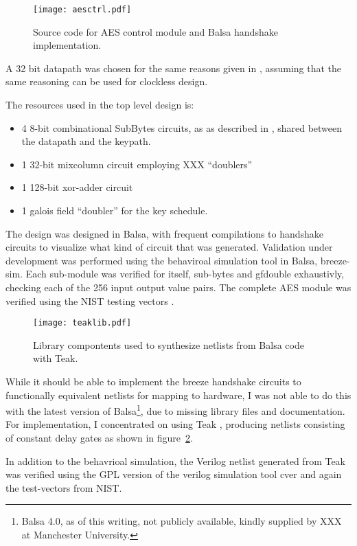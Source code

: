 \begin{figure}[htbp]
  \centering
  \texttt{[image: aesctrl.pdf]}
  \caption{Source code for AES control module and Balsa handshake
    implementation.}
  \label{fig:aesctrl}
\end{figure}

A 32 bit datapath was chosen for the same reasons given in
\cite{ekelund}, assuming that the same reasoning can be used for
clockless design.

The resources used in the top level design is:
\begin{itemize}
   \item 4 8-bit combinational SubBytes circuits, as as described in
     \cite{combsbox}, shared between the datapath and the keypath.
   \item 1 32-bit mixcolumn circuit employing XXX ``doublers''
   \item 1 128-bit xor-adder circuit
   \item 1 galois field ``doubler'' for the key schedule.
\end{itemize}

The design was designed in Balsa, with frequent compilations to
handshake circuits to visualize what kind of circuit that was
generated. Validation under development was performed using the
behaviroal simulation tool in Balsa, breeze-sim. Each sub-module was
verified for itself, sub-bytes and gfdouble exhaustivly, checking each
of the 256 input output value pairs. The complete AES module was
verified using the NIST testing vectors \cite{nisttest}.


\begin{figure}[htbp]
  \centering
  \texttt{[image: teaklib.pdf]}
  \caption{Library compontents used to synthesize netlists from Balsa
    code with Teak.}
  \label{fig:teaklib}
\end{figure}

While it should be able to implement the breeze handshake circuits to
functionally equivalent netlists for mapping to hardware, I was not
able to do this with the latest version of Balsa\footnote{Balsa 4.0,
  as of this writing, not publicly available, kindly supplied by XXX
  at Manchester University.}, due to missing library files and
documentation. For implementation, I concentrated on using Teak
\cite{teak}, producing netlists consisting of constant delay gates as
shown in figure~\ref{fig:teaklib}.

In addition to the behavrioal simulation, the Verilog netlist
generated from Teak was verified using the GPL version of the verilog
simulation tool cver and again the test-vectors from NIST.
